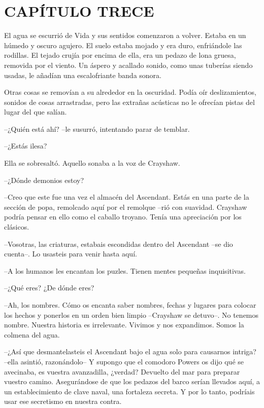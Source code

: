 \chapter*{CAPÍTULO TRECE}

{El agua se escurrió de Vida y sus sentidos comenzaron a volver. Estaba
 en un húmedo y oscuro agujero. El suelo estaba mojado y era duro,
 enfriándole las rodillas. El tejado crujía por encima de ella, era un
 pedazo de lona gruesa, removida por el viento. Un áspero y acallado
 sonido, como unas tuberías siendo usadas, le añadían una escalofriante
banda sonora.}

{Otras cosas se removían a su alrededor en la oscuridad. Podía oír
 deslizamientos, sonidos de cosas arrastradas, pero las extrañas
acústicas no le ofrecían pistas del lugar del que salían.}

{--¿Quién está ahí? --le susurró, intentando parar de temblar.}

{--¿Estás ilesa?}

{Ella se sobresaltó. Aquello sonaba a la voz de Crayshaw.}

{--¿Dónde demonios estoy?}

{--Creo que este fue una vez el almacén del Ascendant. Estás en una
 parte de la sección de popa, remolcado aquí por el remolque --rió con
 suavidad. Crayshaw podría pensar en ello como el caballo troyano. Tenía
una apreciación por los clásicos.}

{--Vosotras, las criaturas, estabais escondidas dentro del Ascendant
--se dio cuenta--. Lo usasteis para venir hasta aquí.}

{--A los humanos les encantan los puzles. Tienen mentes pequeñas
inquisitivas.}

{--¿Qué eres? ¿De dónde eres?}

{--Ah, los nombres. Cómo os encanta saber nombres, fechas y lugares para
 colocar los hechos y ponerlos en un orden bien limpio --Crayshaw se
 detuvo--. No tenemos nombre. Nuestra historia es irrelevante. Vivimos y
nos expandimos. Somos la colmena del agua.}

{--¿Así que desmantelasteis el Ascendant bajo el agua solo para
 causarnos intriga? --ella asintió, razonándolo-- Y supongo que el
 comodoro Powers os dijo qué se avecinaba, es vuestra avanzadilla,
 ¿verdad? Devuelto del mar para preparar vuestro camino. Asegurándose de
 que los pedazos del barco serían llevados aquí, a un establecimiento de
 clave naval, una fortaleza secreta. Y por lo tanto, podríais usar ese
secretismo en nuestra contra.}

